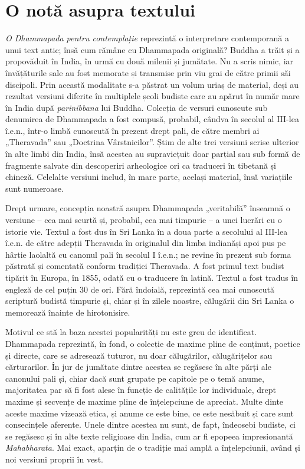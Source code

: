 
\chapter{O notă asupra textului}


\emph{O Dhammapada pentru contemplație} reprezintă o interpretare contemporană a unui text antic; însă cum rămâne cu Dhammapada originală? Buddha a trăit și a propovăduit în India, în urmă cu două milenii și jumătate. Nu a scris nimic, iar învățăturile sale au fost memorate și transmise prin viu grai de către primii săi discipoli. Prin această modalitate s-a păstrat un volum uriaș de material, deși au rezultat versiuni diferite în multiplele școli budiste care au apărut în număr mare în India după \emph{parinibbana} lui Buddha. Colecția de versuri cunoscute sub denumirea de Dhammapada a fost compusă, probabil, cândva în secolul al III-lea î.e.n., într-o limbă cunoscută în prezent drept pali, de către membri ai „Theravada” sau „Doctrina Vârstnicilor”. Știm de alte trei versiuni scrise ulterior în alte limbi din India, însă acestea au supraviețuit doar parțial sau sub formă de fragmente salvate din descoperiri arheologice ori ca traduceri în tibetană și chineză. Celelalte versiuni includ, în mare parte, același material, însă variațiile sunt numeroase.

Drept urmare, concepția noastră asupra Dhammapada „veritabilă” înseamnă o versiune – cea mai scurtă și, probabil, cea mai timpurie – a unei lucrări cu o istorie vie.
Textul a fost dus în Sri Lanka în a doua parte a secolului al III-lea î.e.n. de către adepții Theravada în originalul din limba indianăși apoi pus pe hârtie laolaltă cu canonul pali în secolul I î.e.n.; ne revine în prezent sub forma păstrată și comentată conform tradiției Theravada.
A fost primul text budist tipărit în Europa, în 1855, odată cu o traducere în latină. Textul a fost tradus în engleză de cel puțin 30 de ori. Fără îndoială, reprezintă cea mai cunoscută scriptură budistă timpurie și, chiar și în zilele noastre, călugării din Sri Lanka o memorează înainte de hirotonisire.

Motivul ce stă la baza acestei popularități nu este greu de identificat. Dhammapada reprezintă, în fond, o colecție de maxime pline de conținut, poetice și directe, care se adresează tuturor, nu doar călugărilor, călugărițelor sau cărturarilor. În jur de jumătate dintre acestea se regăsesc în alte părți ale canonului pali și, chiar dacă sunt grupate pe capitole pe o temă anume, majoritatea par să fi fost alese în funcție de calitățile lor individuale, drept maxime și secvențe de maxime pline de înțelepciune de apreciat. Multe dinte aceste maxime vizează etica, și anume ce este bine, ce este nesăbuit și care sunt consecințele aferente. Unele dintre acestea nu sunt, de fapt, îndeosebi budiste, ci se regăsesc și în alte texte religioase din India, cum ar fi epopeea impresionantă \emph{Mahabharata}. Mai exact, aparțin de o tradiție mai amplă a înțelepciunii, având și noi versiuni proprii în vest.

